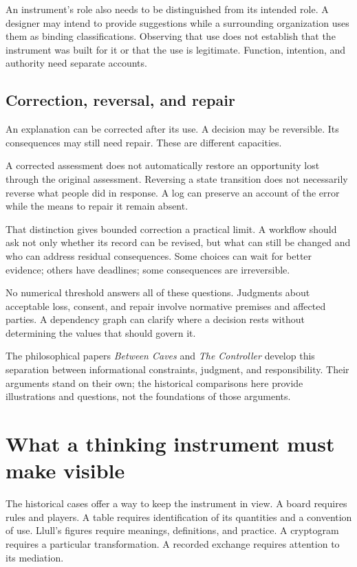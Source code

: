 \documentclass[11pt]{article}
\begin{document}
An instrument's role also needs to be distinguished from its intended role.
A designer may intend to provide suggestions while a surrounding organization
uses them as binding classifications. Observing that use does not establish
that the instrument was built for it or that the use is legitimate.
Function, intention, and authority need separate accounts.

\subsection{Correction, reversal, and repair}

An explanation can be corrected after its use. A decision may be reversible.
Its consequences may still need repair. These are different capacities.

A corrected assessment does not automatically restore an opportunity lost
through the original assessment. Reversing a state transition does not
necessarily reverse what people did in response. A log can preserve an
account of the error while the means to repair it remain absent.

That distinction gives bounded correction a practical limit.
A workflow should ask not only whether its record can be revised, but what
can still be changed and who can address residual consequences. Some choices
can wait for better evidence; others have deadlines; some consequences are
irreversible.

No numerical threshold answers all of these questions. Judgments about
acceptable loss, consent, and repair involve normative premises and affected
parties. A dependency graph can clarify where a decision rests without
determining the values that should govern it.

The philosophical papers \emph{Between Caves} and \emph{The Controller}
develop this separation between informational constraints, judgment,
and responsibility.\cite{caves,controller}
Their arguments stand on their own; the historical comparisons here provide
illustrations and questions, not the foundations of those arguments.

\section{What a thinking instrument must make visible}

The historical cases offer a way to keep the instrument in view.
A board requires rules and players. A table requires identification of its
quantities and a convention of use. Llull's figures require meanings,
definitions, and practice. A cryptogram requires a particular transformation.
A recorded exchange requires attention to its mediation.
\end{document}
